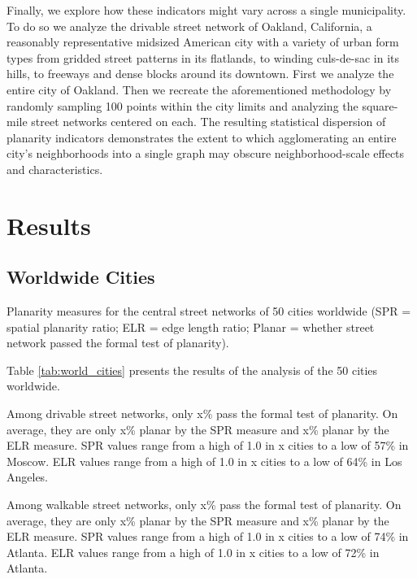 \documentclass[Afour,sageh,times]{sagej}
\begin{document}
Finally, we explore how these indicators might vary across a single municipality. To do so we analyze the drivable street network of Oakland, California, a reasonably representative midsized American city with a variety of urban form types from gridded street patterns in its flatlands, to winding culs-de-sac in its hills, to freeways and dense blocks around its downtown. First we analyze the entire city of Oakland. Then we recreate the aforementioned methodology by randomly sampling 100 points within the city limits and analyzing the square-mile street networks centered on each. The resulting statistical dispersion of planarity indicators demonstrates the extent to which agglomerating an entire city's neighborhoods into a single graph may obscure neighborhood-scale effects and characteristics.




\section{Results}

\subsection{Worldwide Cities}

\begin{table}[htbp]
	\centering
	\caption{Planarity measures for the central street networks of 50 cities worldwide (SPR = spatial planarity ratio; ELR = edge length ratio; Planar = whether street network passed the formal test of planarity).}
	\label{tab:world_cities}
	
\end{table}

Table \ref{tab:world_cities} presents the results of the analysis of the 50 cities worldwide.

Among drivable street networks, only x\% pass the formal test of planarity. On average, they are only x\% planar by the SPR measure and x\% planar by the ELR measure. SPR values range from a high of 1.0 in x cities to a low of 57\% in Moscow. ELR values range from a high of 1.0 in x cities to a low of 64\% in Los Angeles.

Among walkable street networks, only x\% pass the formal test of planarity. On average, they are only x\% planar by the SPR measure and x\% planar by the ELR measure. SPR values range from a high of 1.0 in x cities to a low of 74\% in Atlanta. ELR values range from a high of 1.0 in x cities to a low of 72\% in Atlanta.
\end{document}
